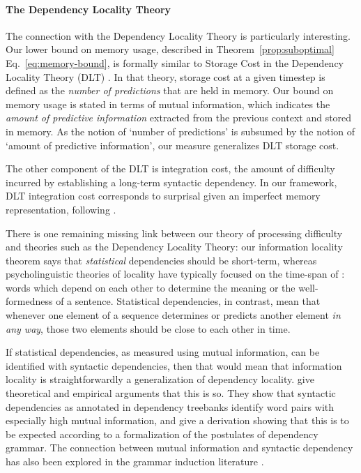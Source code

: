 \paragraph{The Dependency Locality Theory}
The connection with the Dependency Locality Theory is particularly interesting.
Our lower bound on memory usage, described in Theorem~\ref{prop:suboptimal} Eq.~\ref{eq:memory-bound}, is formally similar to Storage Cost in the Dependency Locality Theory (DLT) \citep{gibson1998linguistic,gibson2000dependency}.
In that theory, storage cost at a given timestep is defined as the \emph{number of predictions} that are held in memory.
Our bound on memory usage is stated in terms of mutual information, which indicates the \emph{amount of predictive information} extracted from the previous context and stored in memory.
As the notion of `number of predictions' is subsumed by the notion of `amount of predictive information', our measure generalizes DLT storage cost. 


The other component of the DLT is integration cost, the amount of difficulty incurred by establishing a long-term syntactic dependency. 
In our framework, DLT integration cost corresponds to surprisal given an imperfect memory representation, following \cite{futrell2020lossy}.

There is one remaining missing link between our theory of processing difficulty and theories such as the Dependency Locality Theory:
our information locality theorem says that \emph{statistical} dependencies should be short-term, whereas psycholinguistic theories of locality have typically focused on the time-span of : words which depend on each other to determine the meaning or the well-formedness of a sentence. Statistical dependencies, in contrast, mean that whenever one element of a sequence determines or predicts another element \emph{in any way}, those two elements should be close to each other in time. 

If statistical dependencies, as measured using mutual information, can be identified with syntactic dependencies, then that would mean that information locality is straightforwardly a generalization of dependency locality. \citet{futrell2019syntactic} give theoretical and empirical arguments that this is so. They show that syntactic dependencies as annotated in dependency treebanks identify word pairs with especially high mutual information, and give a derivation showing that this is to be expected according to a formalization of the postulates of dependency grammar. The connection between mutual information and syntactic dependency has also been explored in the grammar induction literature \citep{de1996selection,yuret1998discovery}. %




